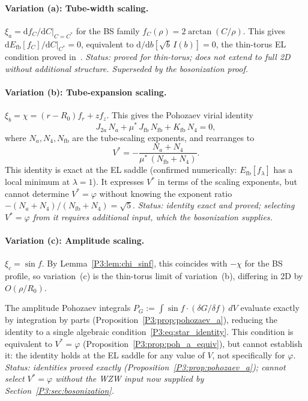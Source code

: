 \documentclass[11pt,a4paper]{article}
\theoremstyle{definition}
\theoremstyle{remark}
\newcommand{\vp}{\varphi}
\begin{document}
\paragraph{Variation (a): Tube-width scaling.}
$\xi_a = \mathrm{d}f_{C}/\mathrm{d}C\big|_{C=C^*}$ for the BS family
$f_C(\rho) = 2\arctan(C/\rho)$.  This gives
$\mathrm{d}E_{\mathrm{fb}}[f_C]/\mathrm{d}C\big|_{C^*} = 0$,
equivalent to $\mathrm{d}/\mathrm{d}b[\sqrt{b}\,I(b)]=0$,
the thin-torus EL condition proved in~\cite{Paper2}.
\emph{Status: proved for thin-torus; does not extend to full 2D
without additional structure.  Superseded by the bosonization proof.}

\paragraph{Variation (b): Tube-expansion scaling.}
$\xi_b = \chi = (r-R_0)f_r + z f_z$.  This gives the Pohozaev
virial identity
\begin{equation}
  J_{2a}\,N_a + \mu^*\,J_{\mathrm{fb}}\,N_{\mathrm{fb}}
  + K_{\mathrm{fb}}\,N_4 = 0,
  \label{P3:eq:pohozaev_b}
\end{equation}
where $N_a,N_4,N_{\mathrm{fb}}$ are the tube-scaling exponents,
and rearranges to
\begin{equation}
  V^* = -\frac{N_a + N_4}{\mu^*\,(N_{\mathrm{fb}} + N_4)}.
  \label{P3:eq:virial_V}
\end{equation}
This identity is exact at the EL saddle (confirmed numerically:
$E_{\mathrm{fb}}[f_\lambda]$ has a local minimum at $\lambda=1$).
It expresses $V^*$ in terms of the scaling exponents, but cannot
determine $V^*=\vp$ without knowing the exponent ratio
$-(N_a+N_4)/(N_{\mathrm{fb}}+N_4) = \sqrt{5}$.
\emph{Status: identity exact and proved; selecting $V^*=\vp$ from it
requires additional input, which the bosonization supplies.}

\paragraph{Variation (c): Amplitude scaling.}
$\xi_c = \sin f$.  By Lemma~\ref{P3:lem:chi_sinf}, this coincides with
$-\chi$ for the BS profile, so variation~(c) is the thin-torus limit
of variation~(b), differing in 2D by $O(\rho/R_0)$.

The amplitude Pohozaev integrals $P_G := \int\!\sin f\cdot(\delta G/\delta f)\,dV$
evaluate exactly by integration by parts (Proposition~\ref{P3:prop:pohozaev_a}),
reducing the identity to a single algebraic condition~\eqref{P3:eq:star_identity}.
This condition is equivalent to $V^*=\vp$ (Proposition~\ref{P3:prop:poh_a_equiv}),
but cannot establish it: the identity holds at the EL saddle for any
value of $V$, not specifically for $\vp$.
\emph{Status: identities proved exactly (Proposition~\ref{P3:prop:pohozaev_a});
cannot select $V^*=\vp$ without the WZW input now supplied by
Section~\ref{P3:sec:bosonization}.}
\end{document}

